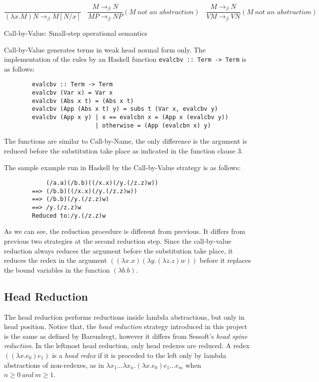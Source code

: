 \documentclass[a4paper,11pt,twoside]{report}
\begin{document}
\begin{equation*}
\frac{}{(\lambda x.M)N \rightarrow _\beta M[N/x]}\ \ \ \  
\frac{M \rightarrow _\beta N}{MP \rightarrow _\beta NP}(M\ \textit{not an abstraction})\ \ \ \
\frac{M \rightarrow _\beta N}{VM \rightarrow _\beta VN}(M\ \textit{not an abstraction})\ \ \ 
\end{equation*}
\begin{center}
Call-by-Value: Small-step operational semantics
\end{center}

Call-by-Value generates terms in weak head normal form only. The implementation of the rules by an Haskell function \verb|evalcbv :: Term -> Term| is as follows:

\begin{verbatim}
        evalcbv :: Term -> Term
        evalcbv (Var x) = Var x
        evalcbv (Abs x t) = (Abs x t)
        evalcbv (App (Abs x t) y) = subs t (Var x, evalcbv y)
        evalcbv (App x y) | x == evalcbn x = (App x (evalcbv y))
                          | otherwise = (App (evalcbn x) y)  
\end{verbatim}

The functions are similar to Call-by-Name, the only difference is the argument is reduced before the substitution take place as indicated in the function clause 3.

The sample example run in Haskell by the Call-by-Value strategy is as follows:

\begin{verbatim}
            (/a.a)(/b.b)((/x.x)(/y.(/z.z)w))
        ==> (/b.b)((/x.x)(/y.(/z.z)w))
        ==> (/b.b)(/y.(/z.z)w)
        ==> /y.(/z.z)w
        Reduced to:/y.(/z.z)w
\end{verbatim}

As we can see, the reduction procedure is different from previous. It differs from previous two strategies at the second reduction step. Since the call-by-value reduction always reduces the argument before the substitution take place, it reduces the redex in the argument $((\lambda x.x)(\lambda y.(\lambda z.z)w))$ before it replaces the bound variables in the function $(\lambda b.b)$.    


\subsection{Head Reduction}

The head reduction performs reductions inside lambda abstractions, but only in head position. Notice that, the \textit{head reduction} strategy introduced in this project is the same as defined by Barendregt, however it differs from Sessoft's \textit{head spine reduction}. In the leftmost head reduction, only head redexes are reduced. A redex $((\lambda x.e_0)e_1)$ is a \textit{head redex} if it is proceded to the left only by lambda abstractions of non-redexes, as in $\lambda x_1...\lambda x_n.(\lambda x.e_0)e_1...e_m$ when $n \geqslant 0\ and\ m \geqslant 1$.
\end{document}
